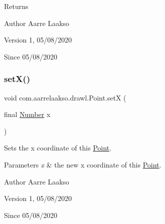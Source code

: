 \begin{DoxyReturn}{Returns}

\end{DoxyReturn}
\begin{DoxyAuthor}{Author}
Aarre Laakso 
\end{DoxyAuthor}
\begin{DoxyVersion}{Version}
1, 05/08/2020 
\end{DoxyVersion}
\begin{DoxySince}{Since}
05/08/2020 
\end{DoxySince}
\mbox{\label{classcom_1_1aarrelaakso_1_1drawl_1_1_point_acf1cca24c7cf879f402e1b549a5e3864}} 
\subsubsection{\texorpdfstring{set\+X()}{setX()}}
{\footnotesize\ttfamily void com.\+aarrelaakso.\+drawl.\+Point.\+setX (\begin{DoxyParamCaption}\item[{final \hyperlink{interfacecom_1_1aarrelaakso_1_1drawl_1_1_number}{Number}}]{x }\end{DoxyParamCaption})\hspace{0.3cm}{\ttfamily [protected]}}



Sets the x coordinate of this \hyperlink{classcom_1_1aarrelaakso_1_1drawl_1_1_point}{Point}. 


\begin{DoxyParams}{Parameters}
{\em x} & the new x coordinate of this \hyperlink{classcom_1_1aarrelaakso_1_1drawl_1_1_point}{Point}. \\
\hline
\end{DoxyParams}
\begin{DoxyAuthor}{Author}
Aarre Laakso 
\end{DoxyAuthor}
\begin{DoxyVersion}{Version}
1, 05/08/2020 
\end{DoxyVersion}
\begin{DoxySince}{Since}
05/08/2020 
\end{DoxySince}
\mbox{\label{classcom_1_1aarrelaakso_1_1drawl_1_1_point_a713f16e843349993ac2b79bc05b5aeb6}} 
